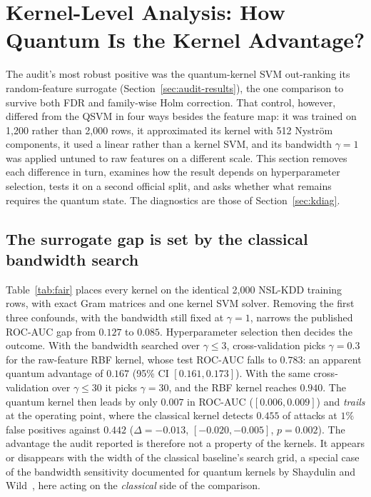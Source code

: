 \section{Kernel-Level Analysis: How Quantum Is the Kernel Advantage?}\label{sec:kernel}
The audit's most robust positive was the quantum-kernel SVM out-ranking its random-feature surrogate
(Section~\ref{sec:audit-results}), the one comparison to survive both FDR and family-wise Holm
correction. That control, however, differed from the QSVM in four ways besides the feature map: it was
trained on 1{,}200 rather than 2{,}000 rows, it approximated its kernel with 512 Nystr\"om components,
it used a linear rather than a kernel SVM, and its bandwidth $\gamma=1$ was applied untuned to raw
features on a different scale. This section removes each difference in turn, examines how the result
depends on hyperparameter selection, tests it on a second official split, and asks whether what remains
requires the quantum state. The diagnostics are those of Section~\ref{sec:kdiag}.

\subsection{The surrogate gap is set by the classical bandwidth search}\label{sec:kgap}
Table~\ref{tab:fair} places every kernel on the identical 2{,}000 NSL-KDD training rows, with exact Gram
matrices and one kernel SVM solver. Removing the first three confounds, with the bandwidth still fixed at
$\gamma=1$, narrows the published ROC-AUC gap from $0.127$ to $0.085$. Hyperparameter selection then
decides the outcome. With the bandwidth searched over $\gamma\le3$, cross-validation picks $\gamma=0.3$ for
the raw-feature RBF kernel, whose test ROC-AUC falls to $0.783$: an apparent quantum advantage of $0.167$
(95\% CI $[0.161,0.173]$). With the same cross-validation over $\gamma\le30$ it picks $\gamma=30$, and the RBF
kernel reaches $0.940$. The quantum kernel then leads by only $0.007$ in ROC-AUC ($[0.006,0.009]$) and
\emph{trails} at the operating point, where the classical kernel detects $0.455$ of attacks at $1\%$ false
positives against $0.442$ ($\Delta=-0.013$, $[-0.020,-0.005]$, $p=0.002$). The advantage the audit reported
is therefore not a property of the kernels. It appears or disappears with the width of the classical
baseline's search grid, a special case of the bandwidth sensitivity documented for quantum kernels by
Shaydulin and Wild~\cite{shaydulin2022bandwidth}, here acting on the \emph{classical} side of the
comparison.


